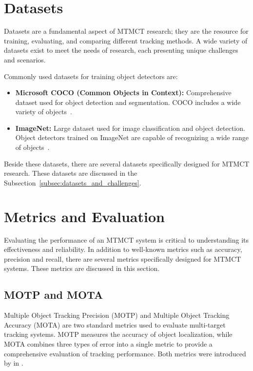 \section{Datasets}\label{sec:datasets}
Datasets are a fundamental aspect of MTMCT research; they are the resource for training, evaluating, and comparing different tracking methods. A wide variety of datasets exist to meet the needs of research, each presenting unique challenges and scenarios.

Commonly used datasets for training object detectors are:

\begin{itemize}
    \item \textbf{Microsoft COCO (Common Objects in Context):} Comprehensive dataset used for object detection and segmentation. COCO includes a wide variety of objects~\cite{Lin14}.
    \item \textbf{ImageNet:} Large dataset used for image classification and object detection. Object detectors trained on ImageNet are capable of recognizing a wide range of objects~\cite{Deng09}.
\end{itemize}

Beside these datasets, there are several datasets specifically designed for MTMCT research. These datasets are discussed in the Subsection~\ref{subsec:datasets_and_challenges}.

\section{Metrics and Evaluation}\label{sec:metrics_and_evaluation}
Evaluating the performance of an MTMCT system is critical to understanding its effectiveness and reliability. In addition to well-known metrics such as accuracy, precision and recall, there are several metrics specifically designed for MTMCT systems. These metrics are discussed in this section.

\subsection{MOTP and MOTA}\label{subsec:motp_mota}
Multiple Object Tracking Precision (MOTP) and Multiple Object Tracking Accuracy (MOTA) are two standard metrics used to evaluate multi-target tracking systems. MOTP measures the accuracy of object localization, while MOTA combines three types of error into a single metric to provide a comprehensive evaluation of tracking performance. Both metrics were introduced by \textcite{Bernardin08} in \citeyear{Bernardin08}.

